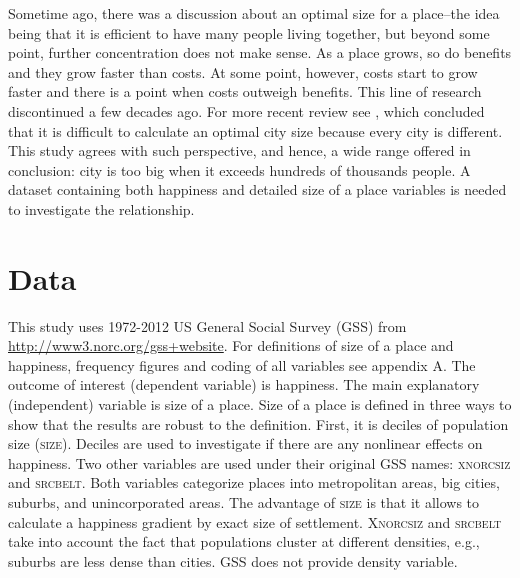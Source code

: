 \documentclass[12pt, letterpaper]{article}
\begin{document}
\begin{spacing}{1.9}

Sometime ago, there was a discussion about an optimal size for a place--the idea
being that it is efficient to have many people living together, but beyond some
point, further concentration does not make sense. As a place
grows, so do benefits and they grow faster than costs.  At some point, however,
 costs start to grow faster and there is a point when costs outweigh
benefits. This line of research
\citep[e.g.,][]{singell74,elgin75} discontinued a few decades ago. For more recent review see \citet{capello00}, which
concluded that it is difficult to calculate an optimal city size because every
city is different. This study agrees with such perspective, and hence, a wide
range offered in conclusion: city is too big when it exceeds hundreds of
thousands people. A dataset containing both happiness and detailed size of a place
variables is needed to investigate the relationship.


\section*{Data}

This study uses 1972-2012 US General Social Survey (GSS) from \url{http://www3.norc.org/gss+website}. For definitions of size of a  place and happiness, frequency figures and coding of all variables see appendix A.
The outcome of interest (dependent variable) is
 happiness.  
 The main explanatory (independent) variable
is size of a place. 
Size of a place is defined  in three ways to show that the
results are robust to the definition. 
First, it is  deciles of population size (\textsc{size}). Deciles are used to
investigate if there are any nonlinear effects on {happiness}.  Two other variables are used under their original GSS names: \textsc{xnorcsiz} and
\textsc{srcbelt}. Both variables categorize places  into metropolitan
areas, big cities, suburbs, and  unincorporated areas.
 The advantage of
\textsc{size} is that it allows to calculate a happiness gradient by
exact size of settlement. \textsc{Xnorcsiz} and \textsc{srcbelt} take
into account the fact that populations cluster at different densities, e.g., suburbs are less dense than cities. GSS does not provide 
  density variable.


\end{spacing}
\end{document}

